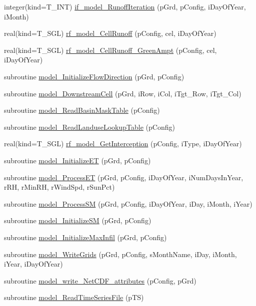 \begin{DoxyCompactItemize}
\item 
integer(kind=T\_\-INT) \hyperlink{namespacemodel_a6ff4163ec4cc3501c34cd52c6693b5ce}{if\_\-model\_\-RunoffIteration} (pGrd, pConfig, iDayOfYear, iMonth)
\item 
real(kind=T\_\-SGL) \hyperlink{namespacemodel_ad02323b54a65796a101d7c54c188b9fd}{rf\_\-model\_\-CellRunoff} (pConfig, cel, iDayOfYear)
\item 
real(kind=T\_\-SGL) \hyperlink{namespacemodel_a3d56722cb383673437a115933248370e}{rf\_\-model\_\-CellRunoff\_\-GreenAmpt} (pConfig, cel, iDayOfYear)
\item 
subroutine \hyperlink{namespacemodel_abcdfbaf903eadc9beb6cb1373cc689e8}{model\_\-InitializeFlowDirection} (pGrd, pConfig)
\item 
subroutine \hyperlink{namespacemodel_af029705beb69f5efe497c98df460513c}{model\_\-DownstreamCell} (pGrd, iRow, iCol, iTgt\_\-Row, iTgt\_\-Col)
\item 
subroutine \hyperlink{namespacemodel_afed7f38c856c81bb8ddc737e4789210d}{model\_\-ReadBasinMaskTable} (pConfig)
\item 
subroutine \hyperlink{namespacemodel_a42d088fe01089d49d07e112457c71f0c}{model\_\-ReadLanduseLookupTable} (pConfig)
\item 
real(kind=T\_\-SGL) \hyperlink{namespacemodel_a0bd4839eca85d4a4a9aaebcebea25537}{rf\_\-model\_\-GetInterception} (pConfig, iType, iDayOfYear)
\item 
subroutine \hyperlink{namespacemodel_ac7e2bc0bbdb50b958a89ea325128c3ac}{model\_\-InitializeET} (pGrd, pConfig)
\item 
subroutine \hyperlink{namespacemodel_a1c26c5d7a1bc470655af8fe1e491721a}{model\_\-ProcessET} (pGrd, pConfig, iDayOfYear, iNumDaysInYear, rRH, rMinRH, rWindSpd, rSunPct)
\item 
subroutine \hyperlink{namespacemodel_a27f02a2a80a6bfde66da43255ad3bf95}{model\_\-ProcessSM} (pGrd, pConfig, iDayOfYear, iDay, iMonth, iYear)
\item 
subroutine \hyperlink{namespacemodel_a3165f34d9843c956320ef4af2065911c}{model\_\-InitializeSM} (pGrd, pConfig)
\item 
subroutine \hyperlink{namespacemodel_a1909929d8c2992c9ab361ff0990bffea}{model\_\-InitializeMaxInfil} (pGrd, pConfig)
\item 
subroutine \hyperlink{namespacemodel_a88548b5c0028dc03fe900fc5b7aa6ce7}{model\_\-WriteGrids} (pGrd, pConfig, sMonthName, iDay, iMonth, iYear, iDayOfYear)
\item 
subroutine \hyperlink{namespacemodel_a1e0b3d86bd3f04da0f11d8d2eb44a18f}{model\_\-write\_\-NetCDF\_\-attributes} (pConfig, pGrd)
\item 
subroutine \hyperlink{namespacemodel_a3d4dfe87dab6e9b969b81dc3f41763ec}{model\_\-ReadTimeSeriesFile} (pTS)
\end{DoxyCompactItemize}
